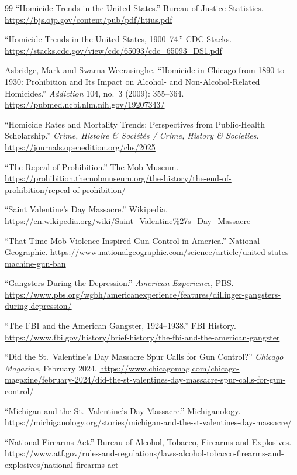 \documentclass[12pt,openany]{book}
\begin{document}
\begin{thebibliography}{99}
``Homicide Trends in the United States.'' Bureau of Justice Statistics. \url{https://bjs.ojp.gov/content/pub/pdf/htius.pdf}

``Homicide Trends in the United States, 1900--74.'' CDC Stacks. \url{https://stacks.cdc.gov/view/cdc/65093/cdc_65093_DS1.pdf}

Asbridge, Mark and Swarna Weerasinghe. ``Homicide in Chicago from 1890 to 1930: Prohibition and Its Impact on Alcohol- and Non-Alcohol-Related Homicides.'' \textit{Addiction} 104, no.~3 (2009): 355--364. \url{https://pubmed.ncbi.nlm.nih.gov/19207343/}

``Homicide Rates and Mortality Trends: Perspectives from Public-Health Scholarship.'' \textit{Crime, Histoire \& Soci\'{e}t\'{e}s / Crime, History \& Societies}. \url{https://journals.openedition.org/chs/2025}

``The Repeal of Prohibition.'' The Mob Museum. \url{https://prohibition.themobmuseum.org/the-history/the-end-of-prohibition/repeal-of-prohibition/}

``Saint Valentine's Day Massacre.'' Wikipedia. \url{https://en.wikipedia.org/wiki/Saint_Valentine\%27s_Day_Massacre}

``That Time Mob Violence Inspired Gun Control in America.'' National Geographic. \url{https://www.nationalgeographic.com/science/article/united-states-machine-gun-ban}

``Gangsters During the Depression.'' \textit{American Experience}, PBS. \url{https://www.pbs.org/wgbh/americanexperience/features/dillinger-gangsters-during-depression/}

``The FBI and the American Gangster, 1924--1938.'' FBI History. \url{https://www.fbi.gov/history/brief-history/the-fbi-and-the-american-gangster}

``Did the St.\ Valentine's Day Massacre Spur Calls for Gun Control?'' \textit{Chicago Magazine}, February 2024. \url{https://www.chicagomag.com/chicago-magazine/february-2024/did-the-st-valentines-day-massacre-spur-calls-for-gun-control/}

``Michigan and the St.\ Valentine's Day Massacre.'' Michiganology. \url{https://michiganology.org/stories/michigan-and-the-st-valentines-day-massacre/}

``National Firearms Act.'' Bureau of Alcohol, Tobacco, Firearms and Explosives. \url{https://www.atf.gov/rules-and-regulations/laws-alcohol-tobacco-firearms-and-explosives/national-firearms-act}


\end{thebibliography}
\end{document}
